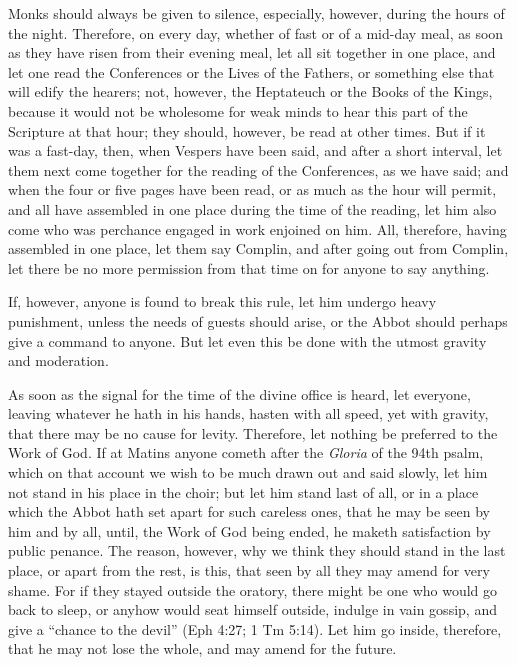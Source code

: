 
Monks should always be given to silence, especially, however, during the hours of the night. Therefore, on every day, whether of fast or of a mid-day meal, as soon as they have risen from their evening meal, let all sit together in one place, and let one read the Conferences or the Lives of the Fathers, or something else that will edify the hearers; not, however, the Heptateuch or the Books of the Kings, because it would not be wholesome for weak minds to hear this part of the Scripture at that hour; they should, however, be read at other times. But if it was a fast-day, then, when Vespers have been said, and after a short interval, let them next come together for the reading of the Conferences, as we have said; and when the four or five pages have been read, or as much as the hour will permit, and all have assembled in one place during the time of the reading, let him also come who was perchance engaged in work enjoined on him. All, therefore, having assembled in one place, let them say Complin, and after going out from Complin, let there be no more permission from that time on for anyone to say anything.

If, however, anyone is found to break this rule, let him undergo heavy punishment, unless the needs of guests should arise, or the Abbot should perhaps give a command to anyone. But let even this be done with the utmost gravity and moderation.


As soon as the signal for the time of the divine office is heard, let everyone, leaving whatever he hath in his hands, hasten with all speed, yet with gravity, that there may be no cause for levity. Therefore, let nothing be preferred to the Work of God. If at Matins anyone cometh after the \emph{Gloria} of the 94th psalm, which on that account we wish to be much drawn out and said slowly, let him not stand in his place in the choir; but let him stand last of all, or in a place which the Abbot hath set apart for such careless ones, that he may be seen by him and by all, until, the Work of God being ended, he maketh satisfaction by public penance. The reason, however, why we think they should stand in the last place, or apart from the rest, is this, that seen by all they may amend for very shame. For if they stayed outside the oratory, there might be one who would go back to sleep, or anyhow would seat himself outside, indulge in vain gossip, and give a ``chance to the devil'' (Eph 4:27; 1 Tm 5:14). Let him go inside, therefore, that he may not lose the whole, and may amend for the future.

